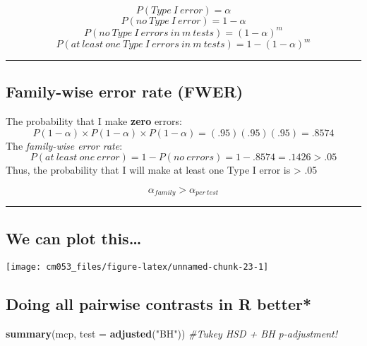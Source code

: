 \documentclass[]{article}
\newenvironment{Shaded}{\begin{snugshade}}{\end{snugshade}}
\newcommand{\CommentTok}[1]{\textcolor[rgb]{0.56,0.35,0.01}{\textit{#1}}}
\newcommand{\DataTypeTok}[1]{\textcolor[rgb]{0.13,0.29,0.53}{#1}}
\newcommand{\KeywordTok}[1]{\textcolor[rgb]{0.13,0.29,0.53}{\textbf{#1}}}
\newcommand{\NormalTok}[1]{#1}
\newcommand{\StringTok}[1]{\textcolor[rgb]{0.31,0.60,0.02}{#1}}
\begin{document}
\[P(Type \: I \: error)=\alpha\]
\[P(no \: Type \: I \: error)=1-\alpha\]
\[P(no \:Type\:I\:errors\:in\:m\:tests)=(1-\alpha)^m\]
\[P(at\:least\:one\:Type\:I\:errors\:in\:m\:tests)=1-(1-\alpha)^m\]

\begin{center}\rule{0.5\linewidth}{\linethickness}\end{center}

\hypertarget{family-wise-error-rate-fwer}{%
\subsection{Family-wise error rate
(FWER)}\label{family-wise-error-rate-fwer}}

The probability that I make \textbf{zero} errors:
\[P(1-\alpha)\times{P(1-\alpha)}\times{P(1-\alpha)}=(.95)(.95)(.95)=.8574\]
The \emph{family-wise error rate}:
\[P(at\:least\:one\:error)=1-P(no\:errors)=1-.8574=.1426 > .05\] Thus,
the probability that I will make at least one Type I error is
\textgreater{} .05

\[\alpha_{family}>\alpha_{per\:test}\]

\begin{center}\rule{0.5\linewidth}{\linethickness}\end{center}

\hypertarget{we-can-plot-this}{%
\subsection{We can plot this\ldots{}}\label{we-can-plot-this}}

\texttt{[image: cm053\_files/figure-latex/unnamed-chunk-23-1]}

\hypertarget{doing-all-pairwise-contrasts-in-r-better-2}{%
\subsection{Doing all pairwise contrasts in R
better*}\label{doing-all-pairwise-contrasts-in-r-better-2}}

\begin{Shaded}
\begin{Highlighting}[]
\KeywordTok{summary}\NormalTok{(mcp, }\DataTypeTok{test =} \KeywordTok{adjusted}\NormalTok{(}\StringTok{"BH"}\NormalTok{)) }\CommentTok{#Tukey HSD + BH p-adjustment!}
\end{Highlighting}
\end{Shaded}
\end{document}
